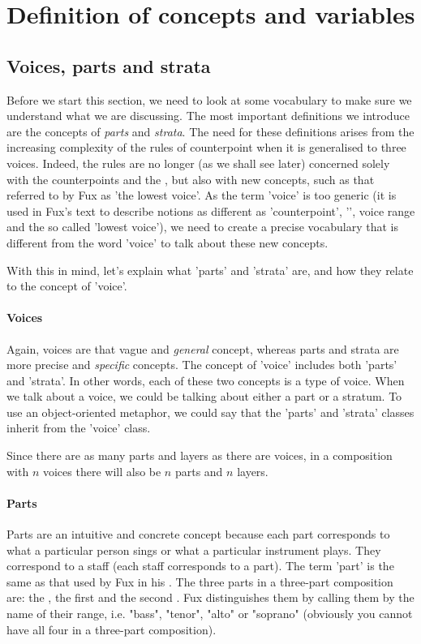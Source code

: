 \chapter{Definition of concepts and variables} \label{chapter:defining-some-concepts-and-redifing-the-variables}
\section{Voices, parts and strata}\label{section:parts-and-strata}
Before we start this section, we need to look at some vocabulary to make sure we understand what we are discussing. The most important definitions we introduce are the concepts of \textit{parts} and \textit{strata}. The need for these definitions arises from the increasing complexity of the rules of counterpoint when it is generalised to three voices. Indeed, the rules are no longer (as we shall see later) concerned solely with the counterpoints and the \cf, but also with new concepts, such as that referred to by Fux as 'the lowest voice'. As the term 'voice' is too generic (it is used in Fux's text to describe notions as different as 'counterpoint', '\cf', voice range and the so called 'lowest voice'), we need to create a precise vocabulary that is different from the word 'voice' to talk about these new concepts. 


With this in mind, let's explain what 'parts' and 'strata' are, and how they relate to the concept of 'voice'.

\subsubsection{Voices} Again, voices are that vague and \textit{general} concept, whereas parts and strata are more precise and \textit{specific} concepts. The concept of 'voice' includes both 'parts' and 'strata'. In other words, each of these two concepts is a type of voice. When we talk about a voice, we could be talking about either a part or a stratum. To use an object-oriented metaphor, we could say that the 'parts' and 'strata' classes inherit from the 'voice' class.

Since there are as many parts and layers as there are voices, in a composition with $n$ voices there will also be $n$ parts and $n$ layers.

\subsubsection{Parts}
Parts are an intuitive and concrete concept because each part corresponds to what a particular person sings or what a particular instrument plays. They correspond to a staff (each staff corresponds to a part). The term 'part' is the same as that used by Fux in his \gap. The three parts in a three-part composition are: the \cf, the first \cps and the second \cp. Fux distinguishes them by calling them by the name of their range, i.e. "bass", "tenor", "alto" or "soprano" (obviously you cannot have all four in a three-part composition).

